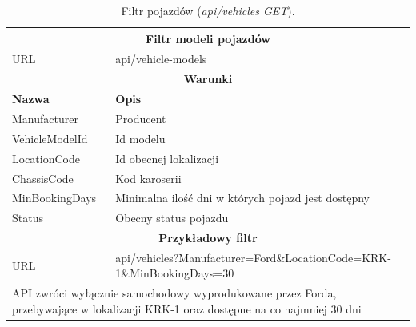 \documentclass[eng,printmode,openany]{mgr}
\begin{document}
	\begin{table}[H]
		\caption{Filtr pojazdów (\textit{api/vehicles GET}).}
		\begin{tabularx}{\textwidth}{|l|X|}
			\hline                                       							
			\multicolumn{2}{|c|}{\textbf{Filtr modeli pojazdów}}  							        	\\ \hline
			URL                 & api/vehicle-models     							             		\\ \hline
			\multicolumn{2}{|c|}{\textbf{Warunki}}     													\\ \hline
			\textbf{Nazwa}      & \textbf{Opis}              											\\ \hline
			Manufacturer        & Producent         													\\ \hline
			VehicleModelId      & Id modelu	        													\\ \hline
			LocationCode        & Id obecnej lokalizacji												\\ \hline
			ChassisCode         & Kod karoserii 	  													\\ \hline
			MinBookingDays      & Minimalna ilość dni w których pojazd jest dostępny					\\ \hline
			Status              & Obecny status pojazdu         										\\ \hline										
			\multicolumn{2}{|c|}{\textbf{Przykładowy filtr}}											\\ \hline
			URL                 & api/vehicles?Manufacturer=Ford\&LocationCode=KRK-1\&MinBookingDays=30	\\ \hline
			\multicolumn{2}{|X|}{API zwróci wyłącznie samochodowy wyprodukowane przez Forda, przebywające w lokalizacji KRK-1 oraz dostępne na co najmniej 30 dni}		\\ \hline
		\end{tabularx}
	\end{table}
	
\end{document}
